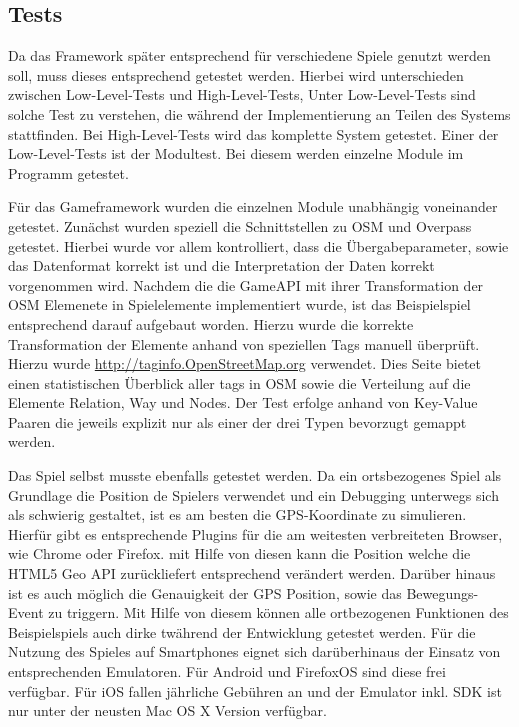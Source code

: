 \subsection*{Tests}

Da das Framework später entsprechend für verschiedene Spiele genutzt werden soll, muss dieses entsprechend getestet werden.
Hierbei wird unterschieden zwischen Low-Level-Tests und High-Level-Tests\cite{Pol.2002},
Unter Low-Level-Tests sind solche Test zu verstehen, die während der Implementierung an Teilen des Systems stattfinden. Bei High-Level-Tests wird das komplette System getestet. Einer der Low-Level-Tests ist der Modultest. Bei diesem werden einzelne Module im Programm getestet.  

Für das Gameframework wurden die einzelnen Module unabhängig voneinander getestet. Zunächst wurden speziell die Schnittstellen zu OSM und Overpass getestet. Hierbei wurde vor allem kontrolliert, dass die Übergabeparameter, sowie das Datenformat korrekt ist und die Interpretation der Daten korrekt vorgenommen wird.
Nachdem die die GameAPI mit ihrer Transformation der OSM Elemenete in Spielelemente implementiert wurde, ist das Beispielspiel entsprechend darauf aufgebaut worden. Hierzu wurde die korrekte Transformation der Elemente anhand von speziellen Tags manuell überprüft. Hierzu wurde \url{http://taginfo.OpenStreetMap.org} verwendet. Dies Seite bietet einen statistischen Überblick aller tags in OSM sowie die Verteilung auf die Elemente Relation, Way und Nodes. Der Test erfolge anhand von Key-Value Paaren die jeweils explizit nur als einer der drei Typen bevorzugt gemappt werden.

Das Spiel selbst musste ebenfalls getestet werden. Da ein ortsbezogenes Spiel als Grundlage die Position de Spielers verwendet und ein Debugging unterwegs sich als schwierig gestaltet, ist es am besten die GPS-Koordinate zu simulieren. Hierfür gibt es entsprechende Plugins für die am weitesten verbreiteten Browser, wie Chrome oder Firefox. mit Hilfe von diesen kann die Position welche die HTML5  Geo API zurückliefert entsprechend verändert werden. Darüber hinaus ist es auch möglich die Genauigkeit der GPS Position, sowie das Bewegungs-Event zu triggern. Mit Hilfe von diesem können alle ortbezogenen Funktionen des Beispielspiels auch dirke twährend der Entwicklung getestet werden.
Für die Nutzung des Spieles auf Smartphones eignet sich darüberhinaus der Einsatz von entsprechenden Emulatoren. Für Android und FirefoxOS sind diese frei verfügbar. Für iOS fallen jährliche Gebühren an und der Emulator inkl. SDK ist nur unter der neusten Mac OS X Version verfügbar.

